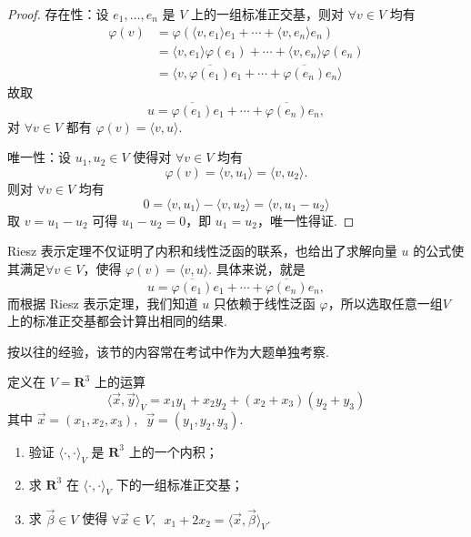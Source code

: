 \begin{proof}
    存在性：设 $e_1, \ldots , e_n$ 是 $ V $ 上的一组标准正交基，则对 $\forall v \in V $ 均有
    \begin{align*}
        \varphi (v) & = \varphi(\langle v, e_1 \rangle e_1 + \cdots + \langle v, e_n \rangle e_n )           \\
                    & = \langle v, e_1 \rangle \varphi (e_1) + \cdots + \langle v, e_n \rangle \varphi (e_n) \\
                    & = \langle v, \overline{\varphi(e_1)}e_1 + \cdots + \overline{\varphi(e_n)}e_n \rangle
    \end{align*}
    故取
    \[ u = \overline{\varphi(e_1)}e_1 + \cdots + \overline{\varphi(e_n)}e_n, \]
    对 $\forall v \in V$ 都有 $\varphi(v) = \langle v, u \rangle .$

    唯一性：设 $ u_1, u_2 \in V $ 使得对 $\forall v \in V $ 均有
    \[\varphi(v) = \langle v, u_1 \rangle = \langle v, u_2 \rangle.\]
    则对 $\forall v \in V $ 均有
    \[ 0 = \langle v, u_1 \rangle - \langle v, u_2 \rangle = \langle v, u_1 - u_2 \rangle\]
    取 $ v = u_1 - u_2 $ 可得 $ u_1 - u_2 = 0 $，即 $ u_1 = u_2 $，唯一性得证.
\end{proof}

Riesz 表示定理不仅证明了内积和线性泛函的联系，也给出了求解向量 $ u $ 的公式使其满足$ \forall v \in V $，使得 $ \varphi(v) = \langle v, u\rangle $. 具体来说，就是
\[ u = \overline{\varphi(e_1)}e_1 + \cdots + \overline{\varphi(e_n)}e_n, \]
而根据 Riesz 表示定理，我们知道 $ u $ 只依赖于线性泛函 $ \varphi $，所以选取任意一组$ V $ 上的标准正交基都会计算出相同的结果.

按以往的经验，该节的内容常在考试中作为大题单独考察.
\begin{example}
    定义在 $ V = \mathbf{R}^3 $ 上的运算
    \[ \langle \vec{x}, \vec{y} \rangle_V = x_1 y_1 + x_2 y_2 + (x_2 + x_3)(y_2 + y_3) \]
    其中 $ \vec{x} = (x_1, x_2, x_3),\enspace \vec{y} = (y_1, y_2, y_3) $.
    \begin{enumerate}
        \item 验证 $ \langle \cdot, \cdot \rangle_V $ 是 $ \mathbf{R}^3 $ 上的一个内积；

        \item 求 $ \mathbf{R}^3 $ 在 $ \langle \cdot, \cdot \rangle_V $ 下的一组标准正交基；

        \item 求 $ \vec{\beta} \in V $ 使得 $ \forall \vec{x} \in V,\enspace x_1 + 2x_2 = \langle \vec{x}, \vec{\beta} \rangle_V $.
    \end{enumerate}
\end{example}

